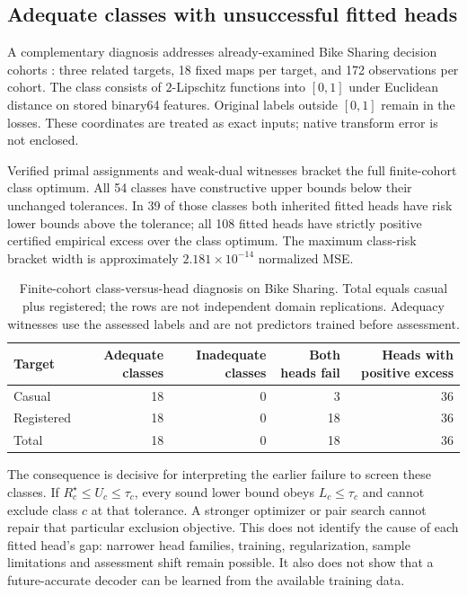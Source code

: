\subsection{Adequate classes with unsuccessful fitted heads}
A complementary diagnosis addresses already-examined Bike Sharing decision cohorts \citep{fanaee2013bike}: three related targets, 18 fixed maps per target, and 172 observations per cohort. The class consists of $2$-Lipschitz functions into $[0,1]$ under Euclidean distance on stored binary64 features. Original labels outside $[0,1]$ remain in the losses. These coordinates are treated as exact inputs; native transform error is not enclosed.

Verified primal assignments and weak-dual witnesses bracket the full finite-cohort class optimum. All 54 classes have constructive upper bounds below their unchanged tolerances. In 39 of those classes both inherited fitted heads have risk lower bounds above the tolerance; all 108 fitted heads have strictly positive certified empirical excess over the class optimum. The maximum class-risk bracket width is approximately $2.181\times10^{-14}$ normalized MSE.

\begin{table}[htbp]
\centering\small
\begin{tabular}{@{}lrrrr@{}}
\toprule
Target & Adequate classes & Inadequate classes & Both heads fail & Heads with positive excess\\
\midrule
Casual & 18 & 0 & 3 & 36\\
Registered & 18 & 0 & 18 & 36\\
Total & 18 & 0 & 18 & 36\\
\bottomrule
\end{tabular}
\caption{Finite-cohort class-versus-head diagnosis on Bike Sharing. Total equals casual plus registered; the rows are not independent domain replications. Adequacy witnesses use the assessed labels and are not predictors trained before assessment.}
\label{tab:diagnosis}
\end{table}

The consequence is decisive for interpreting the earlier failure to screen these classes. If $R_c^\star\leq U_c\leq\tau_c$, every sound lower bound obeys $L_c\leq\tau_c$ and cannot exclude class $c$ at that tolerance. A stronger optimizer or pair search cannot repair that particular exclusion objective. This does not identify the cause of each fitted head's gap: narrower head families, training, regularization, sample limitations and assessment shift remain possible. It also does not show that a future-accurate decoder can be learned from the available training data.

